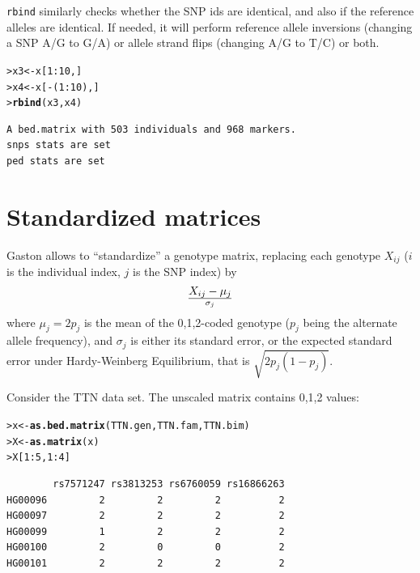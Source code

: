 \documentclass{article}\usepackage[]{graphicx}\usepackage[]{color}
\makeatletter
\newcommand{\hlnum}[1]{\textcolor[rgb]{0.686,0.059,0.569}{#1}}%
\newcommand{\hlopt}[1]{\textcolor[rgb]{0,0,0}{#1}}%
\newcommand{\hlstd}[1]{\textcolor[rgb]{0.345,0.345,0.345}{#1}}%
\newcommand{\hlkwb}[1]{\textcolor[rgb]{0.69,0.353,0.396}{#1}}%
\newcommand{\hlkwd}[1]{\textcolor[rgb]{0.737,0.353,0.396}{\textbf{#1}}}%
\newenvironment{kframe}{%
 \def\at@end@of@kframe{}%
 \ifinner\ifhmode%
  \def\at@end@of@kframe{\end{minipage}}%
  \begin{minipage}{\columnwidth}%
 \fi\fi%
 \def\FrameCommand##1{\hskip\@totalleftmargin \hskip-\fboxsep
 \colorbox{shadecolor}{##1}\hskip-\fboxsep
     \hskip-\linewidth \hskip-\@totalleftmargin \hskip\columnwidth}%
 \MakeFramed {\advance\hsize-\width
   \@totalleftmargin\z@ \linewidth\hsize
   \@setminipage}}%
 {\par\unskip\endMakeFramed%
 \at@end@of@kframe}
\newenvironment{knitrout}{}{} %
\makeatother
\begin{document}
  \verb!rbind! similarly checks whether the SNP ids are identical, and also if the reference
  alleles are identical. If needed, it will perform reference allele inversions (changing a SNP
  A/G to G/A) or allele strand flips (changing A/G to T/C) or both.

\begin{knitrout}
\color{fgcolor}\begin{kframe}
\begin{alltt}
\hlstd{> }\hlstd{x3} \hlkwb{<-} \hlstd{x[}\hlnum{1}\hlopt{:}\hlnum{10}\hlstd{, ]}
\hlstd{> }\hlstd{x4} \hlkwb{<-} \hlstd{x[}\hlopt{-}\hlstd{(}\hlnum{1}\hlopt{:}\hlnum{10}\hlstd{), ]}
\hlstd{> }\hlkwd{rbind}\hlstd{(x3,x4)}
\end{alltt}
\begin{verbatim}
A bed.matrix with 503 individuals and 968 markers.
snps stats are set
ped stats are set
\end{verbatim}
\end{kframe}
\end{knitrout}


\section{Standardized matrices}

  Gaston allows to ``standardize'' a genotype matrix, replacing each genotype $X_{ij}$ ($i$ is the
  individual index, $j$ is the SNP index) by 
\begin{equation}
X_{ij} - \mu_j \over \sigma_j
\end{equation}
  where $\mu_j = 2 p_j$ is the mean of the 0,1,2-coded genotype ($p_j$ being the alternate allele 
  frequency), and $\sigma_j$ is either its standard error, or the expected standard error under Hardy-Weinberg
  Equilibrium, that is $\sqrt{2p_j(1-p_j)}$.

  Consider the TTN data set. The unscaled matrix contains 0,1,2 values:
\begin{knitrout}
\color{fgcolor}\begin{kframe}
\begin{alltt}
\hlstd{> }\hlstd{x} \hlkwb{<-} \hlkwd{as.bed.matrix}\hlstd{(TTN.gen, TTN.fam, TTN.bim)}
\hlstd{> }\hlstd{X} \hlkwb{<-} \hlkwd{as.matrix}\hlstd{(x)}
\hlstd{> }\hlstd{X[}\hlnum{1}\hlopt{:}\hlnum{5}\hlstd{,}\hlnum{1}\hlopt{:}\hlnum{4}\hlstd{]}
\end{alltt}
\begin{verbatim}
        rs7571247 rs3813253 rs6760059 rs16866263
HG00096         2         2         2          2
HG00097         2         2         2          2
HG00099         1         2         2          2
HG00100         2         0         0          2
HG00101         2         2         2          2
\end{verbatim}
\end{kframe}
\end{knitrout}
\end{document}

